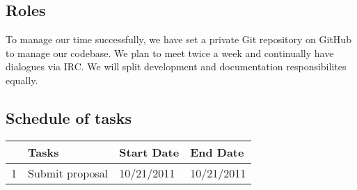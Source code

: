\documentclass{article}
\begin{document}
\subsection{Roles}
To manage our time successfully, we have set a private Git repository on GitHub to manage our codebase. 
We plan to meet twice a week and continually have dialogues via IRC. We will split development and documentation
responsibilites equally.

\subsection{Schedule of tasks}
\begin{tabular}{|l|l|l|l|}
\hline
  & Tasks                     & Start Date    & End Date    \\ \hline
1 & Submit proposal           & 10/21/2011    & 10/21/2011  \\
\hline
\end{tabular}
\end{document}
